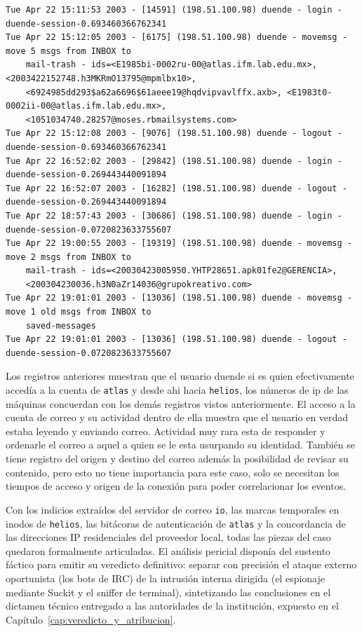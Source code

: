 \begin{lstlisting}[style=terminal]
Tue Apr 22 15:11:53 2003 - [14591] (198.51.100.98) duende - login - duende-session-0.693460366762341
Tue Apr 22 15:12:05 2003 - [6175] (198.51.100.98) duende - movemsg - move 5 msgs from INBOX to 
    mail-trash - ids=<E1985bi-0002ru-00@atlas.ifm.lab.edu.mx>, <2003422152748.h3MKRmO13795@mpmlbx10>, 
    <6924985dd293$a62a6696$61aeee19@hqdvipvavlffx.axb>, <E1983t0-0002ii-00@atlas.ifm.lab.edu.mx>, 
    <1051034740.28257@moses.rbmailsystems.com>
Tue Apr 22 15:12:08 2003 - [9076] (198.51.100.98) duende - logout - duende-session-0.693460366762341
Tue Apr 22 16:52:02 2003 - [29842] (198.51.100.98) duende - login - duende-session-0.269443440091894
Tue Apr 22 16:52:07 2003 - [16282] (198.51.100.98) duende - logout - duende-session-0.269443440091894
Tue Apr 22 18:57:43 2003 - [30686] (198.51.100.98) duende - login - duende-session-0.0720823633755607
Tue Apr 22 19:00:55 2003 - [19319] (198.51.100.98) duende - movemsg - move 2 msgs from INBOX to 
    mail-trash - ids=<20030423005950.YHTP28651.apk01fe2@GERENCIA>, 
    <200304230036.h3N0aZr14036@grupokreativo.com>
Tue Apr 22 19:01:01 2003 - [13036] (198.51.100.98) duende - movemsg - move 1 old msgs from INBOX to 
    saved-messages
Tue Apr 22 19:01:01 2003 - [13036] (198.51.100.98) duende - logout - duende-session-0.0720823633755607
\end{lstlisting}

\vspace{1em}

Los registros anteriores muestran que el usuario duende si es quien
efectivamente accedía a la cuenta de \texttt{atlas} y desde ahi hacia \texttt{helios},
los números de ip de las máquinas concuerdan con los demás registros
vistos anteriormente. El acceso a la cuenta de correo y su actividad
dentro de ella muestra que el usuario en verdad estaba leyendo y
enviando correo. Actividad muy rara esta de responder y ordenarle el
correo a aquel a quien se le esta usurpando su identidad. También se tiene
registro del origen y destino del correo además la posibilidad de
revisar su contenido, pero esto no tiene importancia para este caso, solo
se necesitan los tiempos de acceso y origen de la conexión para poder
correlacionar los eventos.

Con los indicios extraídos del servidor de correo \texttt{io}, las marcas temporales en inodos de \texttt{helios}, las bitácoras de autenticación de \texttt{atlas} y la concordancia de las direcciones IP residenciales del proveedor local, todas las piezas del caso quedaron formalmente articuladas. El análisis pericial disponía del sustento fáctico para emitir su veredicto definitivo: separar con precisión el ataque externo oportunista (los bots de IRC) de la intrusión interna dirigida (el espionaje mediante Suckit y el sniffer de terminal), sintetizando las conclusiones en el dictamen técnico entregado a las autoridades de la institución, expuesto en el Capítulo~\ref{cap:veredicto_y_atribucion}.

